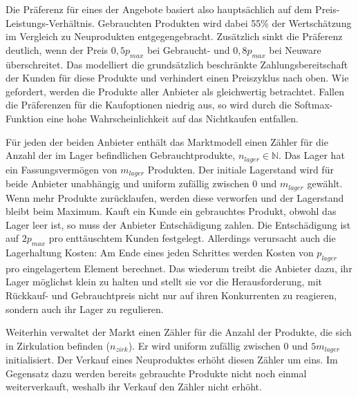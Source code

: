 Die Präferenz für eines der Angebote basiert also hauptsächlich auf dem Preis-Leistungs-Verhältnis.
Gebrauchten Produkten wird dabei 55\% der Wertschätzung im Vergleich zu Neuprodukten entgegengebracht.
Zusätzlich sinkt die Präferenz deutlich, wenn der Preis $0,5 p_{max}$ bei Gebraucht- und $0,8 p_{max}$ bei Neuware überschreitet.
Das modelliert die grundsätzlich beschränkte Zahlungsbereitschaft der Kunden für diese Produkte und verhindert einen Preiszyklus nach oben.
Wie gefordert, werden die Produkte aller Anbieter als gleichwertig betrachtet.
Fallen die Präferenzen für die Kaufoptionen niedrig aus, so wird durch die Softmax-Funktion eine hohe Wahrscheinlichkeit auf das Nichtkaufen entfallen.

Für jeden der beiden Anbieter enthält das Marktmodell einen Zähler für die Anzahl der im Lager befindlichen Gebrauchtprodukte, $n_{lager} \in \mathbb{N}$.
Das Lager hat ein Fassungsvermögen von $m_{lager}$ Produkten.
Der initiale Lagerstand wird für beide Anbieter unabhängig und uniform zufällig zwischen $0$ und $m_{lager}$ gewählt.
Wenn mehr Produkte zurücklaufen, werden diese verworfen und der Lagerstand bleibt beim Maximum.
Kauft ein Kunde ein gebrauchtes Produkt, obwohl das Lager leer ist, so muss der Anbieter Entschädigung zahlen.
Die Entschädigung ist auf $2 p_{max}$ pro enttäuschtem Kunden festgelegt.
Allerdings verursacht auch die Lagerhaltung Kosten: Am Ende eines jeden Schrittes werden Kosten von $p_{lager}$ pro eingelagertem Element berechnet.
Das wiederum treibt die Anbieter dazu, ihr Lager möglichst klein zu halten und stellt sie vor die Herausforderung, mit Rückkauf- und Gebrauchtpreis nicht nur auf ihren Konkurrenten zu reagieren, sondern auch ihr Lager zu regulieren.

Weiterhin verwaltet der Markt einen Zähler für die Anzahl der Produkte, die sich in Zirkulation befinden ($n_{zirk}$).
Er wird uniform zufällig zwischen $0$ und $5 m_{lager}$ initialisiert.
Der Verkauf eines Neuproduktes erhöht diesen Zähler um eins.
Im Gegensatz dazu werden bereits gebrauchte Produkte nicht noch einmal weiterverkauft, weshalb ihr Verkauf den Zähler nicht erhöht.

